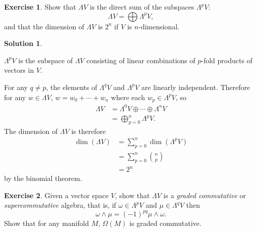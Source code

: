 \documentclass[11pt, a4paper]{report}
\theoremstyle{definition}
\newtheorem{exercise}{Exercise}[part]
\newtheorem{solution}{Solution}[part]
\newenvironment{ex}{\begin{exercise}}{\end{exercise}\pagebreak[1]}
\newenvironment{sol}{\begin{solution}}{\end{solution}\pagebreak[3]}
\begin{document}
\begin{ex}

Show that $\Lambda V$ is the direct sum of the subspaces $\Lambda^p V$:
\[
    \Lambda V = \bigoplus \Lambda^p V,
\]
and that the dimension of $\Lambda V$ is $2^n$ if $V$ is $n$-dimensional.
\end{ex}

\begin{sol}\label{sol:exterioralgebradirectsumofsubspaces}

$\Lambda^p V$ is the subspace of $\Lambda V$ consisting of linear combinations of $p$-fold products of vectors in $V$.

For any $q \neq p$, the elements of $\Lambda^q V$ and $\Lambda^p V$ are linearly independent. Therefore for any $w \in \Lambda V$,
$w = w_0 + \cdots + w_n$
where each $w_p \in \Lambda^p V$, so
\begin{align*}
    \Lambda V &= \Lambda^0 V \oplus \cdots \oplus \Lambda^n V \\
              &= \bigoplus_{p=0}^n \Lambda^p V.
\end{align*}
The dimension of $\Lambda V$ is therefore
\begin{align*}
    \dim(\Lambda V) &= \sum_{p = 0}^n \dim(\Lambda^p V) \\
                    &= \sum_{p = 0}^n \binom{n}{p} \\
                    &= 2^n
\end{align*}
by the binomial theorem.

\end{sol}

\begin{ex}

Given a vector space $V$, show that $\Lambda V$ is a \emph{graded commutative} or \emph{supercommutative} algebra, that is, if $\omega \in \Lambda^p V$ and $\mu \in \Lambda^q V$ then
\[
    \omega \wedge \mu = {(-1)}^{pq} \mu \wedge \omega.
\]
Show that for any manifold $M$, $\Omega(M)$ is graded commutative.

\end{ex}
\end{document}
